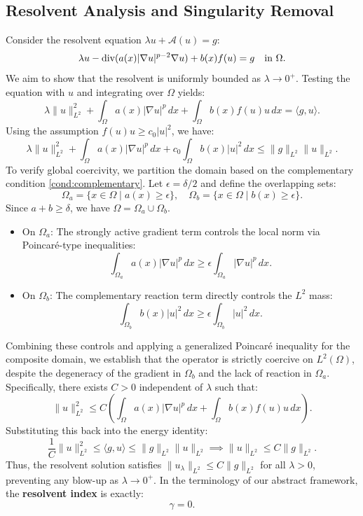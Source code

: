 \documentclass[11pt,reqno]{amsart}
\theoremstyle{remark}
\begin{document}
\subsection{Resolvent Analysis and Singularity Removal}
Consider the resolvent equation $\lambda u + \mathcal{A}(u) = g$:
\[
    \lambda u - \hbox{div}(a(x)|\nabla u|^{p-2}\nabla u) + b(x)f(u) = g \quad \text{in } \Omega.
\]
We aim to show that the resolvent is uniformly bounded as $\lambda \to 0^+$.
Testing the equation with $u$ and integrating over $\Omega$ yields:
\[
    \lambda \|u\|_{L^2}^2 + \int_\Omega a(x)|\nabla u|^p \, dx + \int_\Omega b(x)f(u)u \, dx = \langle g, u \rangle.
\]
Using the assumption $f(u)u \ge c_0 |u|^2$, we have:
\[
    \lambda \|u\|_{L^2}^2 + \int_\Omega a(x)|\nabla u|^p \, dx + c_0 \int_\Omega b(x)|u|^2 \, dx \le \|g\|_{L^2} \|u\|_{L^2}.
\]
To verify global coercivity, we partition the domain based on the complementary condition \eqref{cond:complementary}. Let $\epsilon = \delta/2$ and define the overlapping sets:
\[
    \Omega_a = \{ x \in \Omega \mid a(x) \ge \epsilon \}, \quad \Omega_b = \{ x \in \Omega \mid b(x) \ge \epsilon \}.
\]
Since $a+b \ge \delta$, we have $\Omega = \Omega_a \cup \Omega_b$.
\begin{itemize}
    \item On $\Omega_a$: The strongly active gradient term controls the local norm via Poincaré-type inequalities:
    \[
        \int_{\Omega_a} a(x)|\nabla u|^p \, dx \ge \epsilon \int_{\Omega_a} |\nabla u|^p \, dx.
    \]
    \item On $\Omega_b$: The complementary reaction term directly controls the $L^2$ mass:
    \[
        \int_{\Omega_b} b(x)|u|^2 \, dx \ge \epsilon \int_{\Omega_b} |u|^2 \, dx.
    \]
\end{itemize}
Combining these controls and applying a generalized Poincaré inequality for the composite domain, we establish that the operator is strictly coercive on $L^2(\Omega)$, despite the degeneracy of the gradient in $\Omega_b$ and the lack of reaction in $\Omega_a$. Specifically, there exists $C > 0$ independent of $\lambda$ such that:
\[
    \|u\|_{L^2}^2 \le C \left( \int_\Omega a(x)|\nabla u|^p \,dx + \int_\Omega b(x) f(u)u \,dx \right).
\]
Substituting this back into the energy identity:
\[
    \frac{1}{C} \|u\|_{L^2}^2 \le \langle g, u \rangle \le \|g\|_{L^2} \|u\|_{L^2} \implies \|u\|_{L^2} \le C \|g\|_{L^2}.
\]
Thus, the resolvent solution satisfies $\|u_\lambda\|_{L^2} \le C \|g\|_{L^2}$ for all $\lambda > 0$, preventing any blow-up as $\lambda \to 0^+$. In the terminology of our abstract framework, the \textbf{resolvent index} is exactly:
\[
    \gamma = 0.
\]
\end{document}
